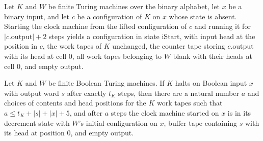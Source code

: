 \begin{lemma}
\label{Complexity.TimeHierarchy.kCfg_rewind}
\leanok
{}
Let $K$ and $W$ be finite Turing machines over the binary alphabet, let $x$ be a binary
input, and let $c$ be a configuration of $K$ on $x$ whose state is absent. Starting the
clock machine from the lifted configuration of $c$ and running it for
$|c.\mathrm{output}|+2$ steps yields a configuration in state $\mathrm{iStart}$, with
input head at the position in $c$, the work tapes of $K$ unchanged, the counter tape
storing $c.\mathrm{output}$ with its head at cell $0$, all work tapes belonging to $W$
blank with their heads at cell $0$, and empty output.
\end{lemma}

\begin{lemma}
\label{Complexity.TimeHierarchy.clockTM_setup}
\leanok
{}
Let $K$ and $W$ be finite Boolean Turing machines. If $K$ halts on Boolean input $x$
with output word $s$ after exactly $t_K$ steps, then there are a natural number $a$ and
choices of contents and head positions for the $K$ work tapes such that $a\le
t_K+|s|+|x|+5$, and after $a$ steps the clock machine started on $x$ is in its decrement
state with $W$'s initial configuration on $x$, buffer tape containing $s$ with its head
at position $0$, and empty output.
\end{lemma}
